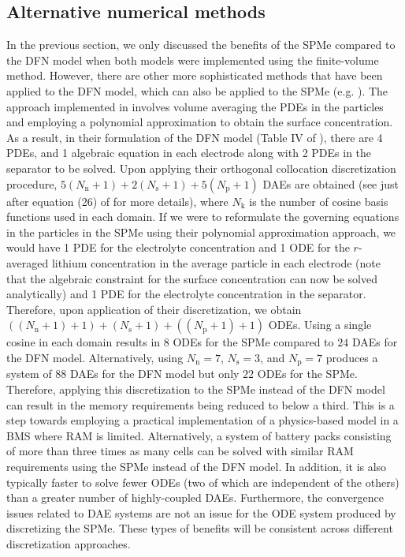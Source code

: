 \documentclass[a4paper]{article}
\newcommand{\ts}[1]{_{\text{#1}}}
\begin{document}
\subsection{Alternative numerical methods}
In the previous section, we only discussed the benefits of the SPMe compared to the DFN model when both models were implemented using the finite-volume method. However, there are other more sophisticated methods that have been applied to the DFN model, which can also be applied to the SPMe (e.g. \cite{Northrop2011a}). The approach implemented in \cite{Northrop2011a} involves volume averaging the PDEs in the particles and employing a polynomial approximation to obtain the surface concentration. As a result, in their formulation of the DFN model (Table IV of \cite{Northrop2011a}), there are 4 PDEs, and 1 algebraic equation in each electrode along with 2 PDEs in the separator to be solved. Upon applying their orthogonal collocation discretization procedure, $5(N\ts{n} + 1) + 2(N\ts{s} + 1) + 5(N\ts{p} + 1)$ DAEs are obtained (see just after equation (26) of \cite{Northrop2011a} for more details), where $N\ts{k}$ is the number of cosine basis functions used in each domain. If we were to reformulate the governing equations in the particles in the SPMe using their polynomial approximation approach, we would have 1 PDE for the electrolyte concentration and 1 ODE for the $r$-averaged lithium concentration in the average particle in each electrode (note that the algebraic constraint for the surface concentration can now be solved analytically) and 1 PDE for the electrolyte concentration in the separator. Therefore, upon application of their discretization, we obtain $((N\ts{n} + 1) + 1) + (N\ts{s} + 1) + ((N\ts{p} + 1) + 1)$ ODEs. Using a single cosine in each domain results in $8$ ODEs for the SPMe compared to $24$ DAEs for the DFN model. Alternatively, using $N\ts{n}=7$, $N\ts{s}=3$, and $N\ts{p}=7$ produces a system of 88 DAEs for the DFN model but only $22$ ODEs for the SPMe. Therefore, applying this discretization to the SPMe instead of the DFN model can result in the memory requirements being reduced to below a third. This is a step towards employing a practical implementation of a physics-based model in a BMS where RAM is limited. Alternatively, a system of battery packs consisting of more than three times as many cells can be solved with similar RAM requirements using the SPMe instead of the DFN model. In addition, it is also typically faster to solve fewer ODEs (two of which are independent of the others) than a greater number of highly-coupled DAEs. Furthermore, the convergence issues related to DAE systems are not an issue for the ODE system produced by discretizing the SPMe. These types of benefits will be consistent across different discretization approaches.
\end{document}

